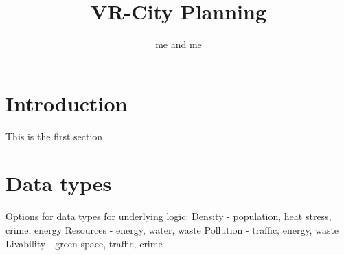 \documentclass{article}
\title{VR-City Planning}
\author{me and me}
\begin{document}
\maketitle

\section{Introduction}
This is the first section

\section{Data types}
Options for data types for underlying logic:
Density - population, heat stress, crime, energy
Resources - energy, water, waste
Pollution - traffic, energy, waste
Livability - green space, traffic, crime
\end{document}
